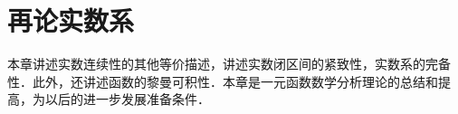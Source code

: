 \chapter{再论实数系}\label{chap:09}

本章讲述实数连续性的其他等价描述，讲述实数闭区间的紧致性，实数系的完备性．此外，还讲述函数的黎曼可积性．本章是一元函数数学分析理论的总结和提高，为以后的进一步发展准备条件．






